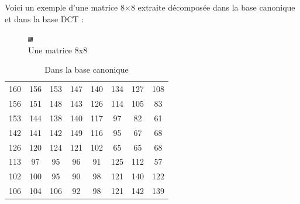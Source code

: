 \documentclass{article}
\begin{document}
Voici un exemple d'une matrice 8$\times$8 extraite décomposée dans la base canonique et dans la base DCT :

\hfill
\begin{minipage}{0.3\textwidth}
    \centering
    \begin{figure}[H]
        \centering
        \includegraphics[width=0.7\linewidth]{bloc_88.png}
        \caption*{\centering Une matrice 8x8}
    \end{figure}
\end{minipage}
\hfill
\begin{minipage}{0.3\textwidth}
    \centering
    \begin{table}[H]
        \setlength{\tabcolsep}{2pt}
        \renewcommand{\arraystretch}{1.2} %

        \centering
        \begin{tabular}{cccccccc}
            160 & 156 & 153 & 147 & 140 & 134 & 127 & 108\\
            156 & 151 & 148 & 143 & 126 & 114 & 105 & 83\\
            153 & 144 & 138 & 140 & 117 & 97 & 82 & 61\\
            142 & 141 & 142 & 149 & 116 & 95 & 67 & 68\\
            126 & 120 & 124 & 121 & 102 & 65 & 65 & 68\\
            113 & 97 & 95 & 96 & 91 & 125 & 112 & 57\\
            102 & 100 & 95 & 90 & 98 & 121 & 140 & 122\\
            106 & 104 & 106 & 92 & 98 & 121 & 142 & 139\\
        \end{tabular}
        \caption*{Dans la base canonique}
    \end{table}
\end{minipage}
\end{document}
